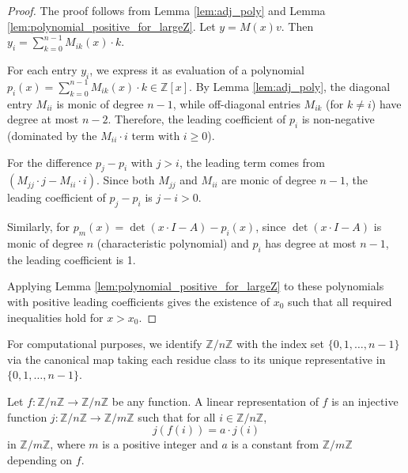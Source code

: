 \begin{proof}
The proof follows from Lemma \ref{lem:adj_poly} and Lemma \ref{lem:polynomial_positive_for_largeZ}.
Let $y = M(x)v$. Then $y_i = \sum_{k=0}^{n-1} M_{ik}(x) \cdot k$.

For each entry $y_i$, we express it as evaluation of a polynomial $p_i(x) = \sum_{k=0}^{n-1} M_{ik}(x) \cdot k \in \mathbb{Z}[x]$.
By Lemma \ref{lem:adj_poly}, the diagonal entry $M_{ii}$ is monic of degree $n-1$, while off-diagonal entries $M_{ik}$ (for $k \neq i$) have degree at most $n-2$.
Therefore, the leading coefficient of $p_i$ is non-negative (dominated by the $M_{ii} \cdot i$ term with $i \geq 0$).

For the difference $p_j - p_i$ with $j > i$, the leading term comes from $(M_{jj} \cdot j - M_{ii} \cdot i)$. Since both $M_{jj}$ and $M_{ii}$ are monic of degree $n-1$, the leading coefficient of $p_j - p_i$ is $j - i > 0$.

Similarly, for $p_m(x) = \det(x\cdot I - A) - p_i(x)$, since $\det(x\cdot I - A)$ is monic of degree $n$ (characteristic polynomial) and $p_i$ has degree at most $n-1$, the leading coefficient is 1.

Applying Lemma \ref{lem:polynomial_positive_for_largeZ} to these polynomials with positive leading coefficients gives the existence of $x_0$ such that all required inequalities hold for $x > x_0$.
\end{proof}

\begin{definition}
\label{def:zmodToFin}
\leanok
For computational purposes, we identify $\mathbb{Z}/n\mathbb{Z}$ with the index set $\{0,1,\ldots,n-1\}$ via the canonical map 
taking each residue class to its unique representative in $\{0,1,\ldots,n-1\}$.
\end{definition}

\begin{definition}
\label{def:linear_representation}
\leanok
Let $f: \mathbb{Z}/n\mathbb{Z} \to \mathbb{Z}/n\mathbb{Z}$ be any function. A linear representation of $f$ is an injective function $j: \mathbb{Z}/n\mathbb{Z} \to \mathbb{Z}/m\mathbb{Z}$ 
such that for all $i\in \mathbb{Z}/n\mathbb{Z}$,
$$j(f(i)) = a \cdot j(i)$$
in $\mathbb{Z}/m\mathbb{Z}$, where $m$ is a positive integer and $a$ is a constant from $\mathbb{Z}/m\mathbb{Z}$ depending on $f$.
\end{definition}

